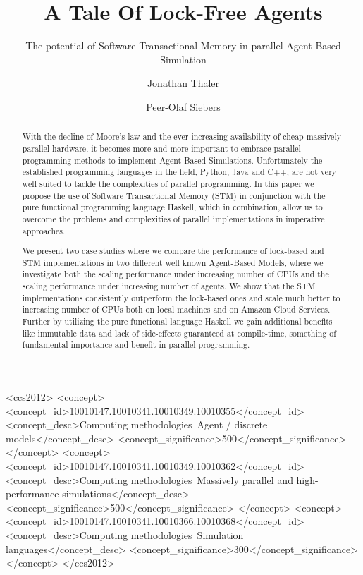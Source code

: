 \documentclass[format=acmsmall, review=true, screen=true]{acmart}
\begin{document}

\title[A Tale Of Lock-Free Agents]{A Tale Of Lock-Free Agents}
\subtitle{The potential of Software Transactional Memory in parallel Agent-Based Simulation}

\author{Jonathan Thaler}
\author{Peer-Olaf Siebers}

\begin{abstract}
With the decline of Moore's law and the ever increasing availability of cheap massively parallel hardware, it becomes more and more important to embrace parallel programming methods to implement Agent-Based Simulations. Unfortunately the established programming languages in the field, Python, Java and C++, are not very well suited to tackle the complexities of parallel programming. In this paper we propose the use of Software Transactional Memory (STM) in conjunction with the pure functional programming language Haskell, which in combination, allow us to overcome the problems and complexities of parallel implementations in imperative approaches.

We present two case studies where we compare the performance of lock-based and STM implementations in two different well known Agent-Based Models, where we investigate both the scaling performance under increasing number of CPUs and the scaling performance under increasing number of agents. We show that the STM implementations consistently outperform the lock-based ones and scale much better to increasing number of CPUs both on local machines and on Amazon Cloud Services. Further by utilizing the pure functional language Haskell we gain additional benefits like immutable data and lack of side-effects guaranteed at compile-time, something of fundamental importance and benefit in parallel programming.
\end{abstract}

%
%
\begin{CCSXML}
<ccs2012>
<concept>
<concept_id>10010147.10010341.10010349.10010355</concept_id>
<concept_desc>Computing methodologies~Agent / discrete models</concept_desc>
<concept_significance>500</concept_significance>
</concept>
<concept>
<concept_id>10010147.10010341.10010349.10010362</concept_id>
<concept_desc>Computing methodologies~Massively parallel and high-performance simulations</concept_desc>
<concept_significance>500</concept_significance>
</concept>
<concept>
<concept_id>10010147.10010341.10010366.10010368</concept_id>
<concept_desc>Computing methodologies~Simulation languages</concept_desc>
<concept_significance>300</concept_significance>
</concept>
</ccs2012>
\end{CCSXML}
\end{document}
